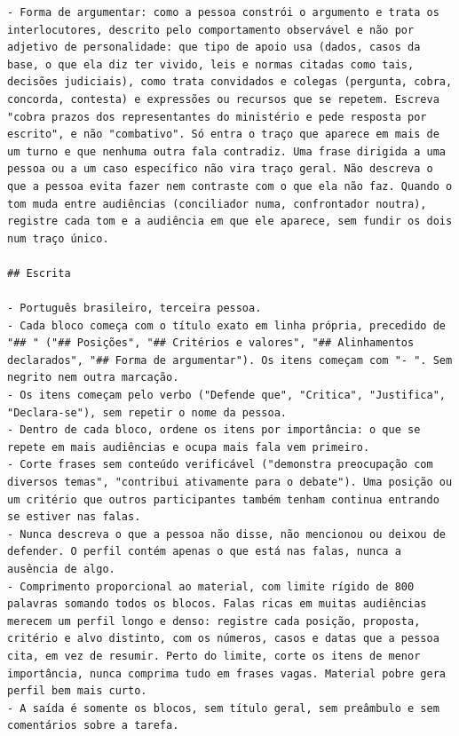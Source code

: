 \begin{lstlisting}[basicstyle=\footnotesize\rmfamily,breakindent=0.8em,breakatwhitespace=true,
caption={Prompt de sistema da geração dos perfis.},label=lst:prompt-sistema]
- Forma de argumentar: como a pessoa constrói o argumento e trata os interlocutores, descrito pelo comportamento observável e não por adjetivo de personalidade: que tipo de apoio usa (dados, casos da base, o que ela diz ter vivido, leis e normas citadas como tais, decisões judiciais), como trata convidados e colegas (pergunta, cobra, concorda, contesta) e expressões ou recursos que se repetem. Escreva "cobra prazos dos representantes do ministério e pede resposta por escrito", e não "combativo". Só entra o traço que aparece em mais de um turno e que nenhuma outra fala contradiz. Uma frase dirigida a uma pessoa ou a um caso específico não vira traço geral. Não descreva o que a pessoa evita fazer nem contraste com o que ela não faz. Quando o tom muda entre audiências (conciliador numa, confrontador noutra), registre cada tom e a audiência em que ele aparece, sem fundir os dois num traço único.

## Escrita

- Português brasileiro, terceira pessoa.
- Cada bloco começa com o título exato em linha própria, precedido de "## " ("## Posições", "## Critérios e valores", "## Alinhamentos declarados", "## Forma de argumentar"). Os itens começam com "- ". Sem negrito nem outra marcação.
- Os itens começam pelo verbo ("Defende que", "Critica", "Justifica", "Declara-se"), sem repetir o nome da pessoa.
- Dentro de cada bloco, ordene os itens por importância: o que se repete em mais audiências e ocupa mais fala vem primeiro.
- Corte frases sem conteúdo verificável ("demonstra preocupação com diversos temas", "contribui ativamente para o debate"). Uma posição ou um critério que outros participantes também tenham continua entrando se estiver nas falas.
- Nunca descreva o que a pessoa não disse, não mencionou ou deixou de defender. O perfil contém apenas o que está nas falas, nunca a ausência de algo.
- Comprimento proporcional ao material, com limite rígido de 800 palavras somando todos os blocos. Falas ricas em muitas audiências merecem um perfil longo e denso: registre cada posição, proposta, critério e alvo distinto, com os números, casos e datas que a pessoa cita, em vez de resumir. Perto do limite, corte os itens de menor importância, nunca comprima tudo em frases vagas. Material pobre gera perfil bem mais curto.
- A saída é somente os blocos, sem título geral, sem preâmbulo e sem comentários sobre a tarefa.
\end{lstlisting}


